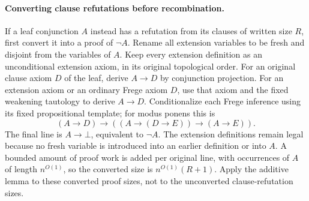 \documentclass[11pt]{article}
\theoremstyle{definition}
\theoremstyle{remark}
\begin{document}
\paragraph{Converting clause refutations before recombination.}
If a leaf conjunction $A$ instead has a refutation from its clauses
of written size $R$, first convert it into a proof of $\neg A$.
Rename all extension variables to be fresh and disjoint from the
variables of $A$. Keep every extension definition as an unconditional
extension axiom, in its original topological order. For an original
clause axiom $D$ of the leaf, derive $A\to D$ by conjunction
projection. For an extension axiom or an ordinary Frege axiom $D$,
use that axiom and the fixed weakening tautology to derive $A\to D$.
Conditionalize each Frege inference using its fixed propositional
template; for modus ponens this is
\[
 (A\to D)\to((A\to(D\to E))\to(A\to E)).
\]
The final line is $A\to\bot$, equivalent to $\neg A$.
The extension definitions remain legal because no fresh variable is
introduced into an earlier definition or into $A$. A bounded amount
of proof work is added per original line, with occurrences of $A$
of length $n^{O(1)}$, so the converted size is
$n^{O(1)}(R+1)$. Apply the additive lemma to these converted proof
sizes, not to the unconverted clause-refutation sizes.
\end{document}
